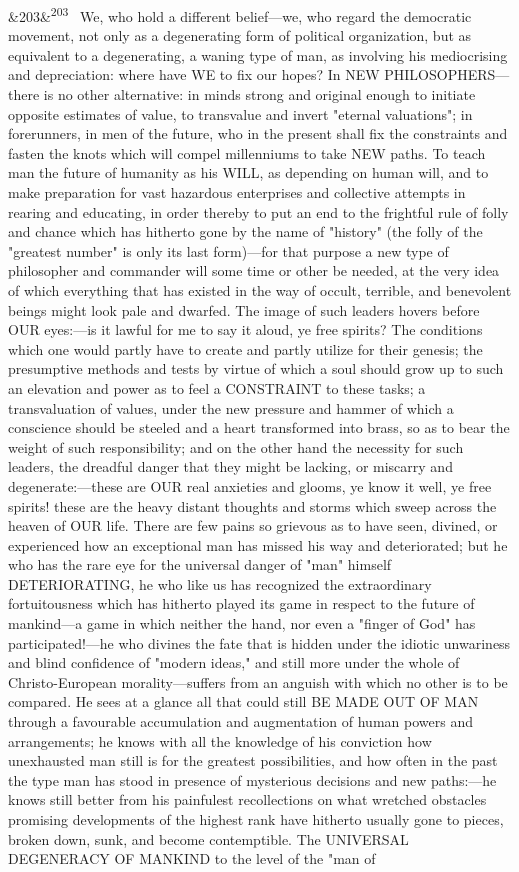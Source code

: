 \documentclass[12pt]{article}
\newcommand{\para}[1][]{\par\noindent\ifx&#1&\else\textsuperscript{\footnotesize #1}~\fi}
\begin{document}
\para[203] We, who hold a different belief---we, who regard the democratic movement, not only as a degenerating form of political organization, but as equivalent to a degenerating, a waning type of man, as involving his mediocrising and depreciation: where have WE to fix our hopes? In NEW PHILOSOPHERS---there is no other alternative: in minds strong and original enough to initiate opposite estimates of value, to transvalue and invert "eternal valuations"; in forerunners, in men of the future, who in the present shall fix the constraints and fasten the knots which will compel millenniums to take NEW paths. To teach man the future of humanity as his WILL, as depending on human will, and to make preparation for vast hazardous enterprises and collective attempts in rearing and educating, in order thereby to put an end to the frightful rule of folly and chance which has hitherto gone by the name of "history" (the folly of the "greatest number" is only its last form)---for that purpose a new type of philosopher and commander will some time or other be needed, at the very idea of which everything that has existed in the way of occult, terrible, and benevolent beings might look pale and dwarfed. The image of such leaders hovers before OUR eyes:---is it lawful for me to say it aloud, ye free spirits? The conditions which one would partly have to create and partly utilize for their genesis; the presumptive methods and tests by virtue of which a soul should grow up to such an elevation and power as to feel a CONSTRAINT to these tasks; a transvaluation of values, under the new pressure and hammer of which a conscience should be steeled and a heart transformed into brass, so as to bear the weight of such responsibility; and on the other hand the necessity for such leaders, the dreadful danger that they might be lacking, or miscarry and degenerate:---these are OUR real anxieties and glooms, ye know it well, ye free spirits! these are the heavy distant thoughts and storms which sweep across the heaven of OUR life. There are few pains so grievous as to have seen, divined, or experienced how an exceptional man has missed his way and deteriorated; but he who has the rare eye for the universal danger of "man" himself DETERIORATING, he who like us has recognized the extraordinary fortuitousness which has hitherto played its game in respect to the future of mankind---a game in which neither the hand, nor even a "finger of God" has participated!---he who divines the fate that is hidden under the idiotic unwariness and blind confidence of "modern ideas," and still more under the whole of Christo-European morality---suffers from an anguish with which no other is to be compared. He sees at a glance all that could still BE MADE OUT OF MAN through a favourable accumulation and augmentation of human powers and arrangements; he knows with all the knowledge of his conviction how unexhausted man still is for the greatest possibilities, and how often in the past the type man has stood in presence of mysterious decisions and new paths:---he knows still better from his painfulest recollections on what wretched obstacles promising developments of the highest rank have hitherto usually gone to pieces, broken down, sunk, and become contemptible. The UNIVERSAL DEGENERACY OF MANKIND to the level of the "man of 
\end{document}
